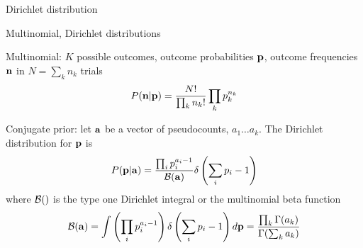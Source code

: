 \documentclass{beamer}
\begin{document}
\begin{frame}{Dirichlet distribution}

\itemb
\item Multinomial, Dirichlet distributions
 \itemb
 \item Multinomial: $K$ possible outcomes, outcome probabilities ${\bf p}$, outcome frequencies ${\bf n}$ in $N=\sum_k n_k$ trials
\[
P({\bf n}|{\bf p}) = \frac{N!}{\prod_k n_k!} \prod_k p_k^{n_k}
\]
\item Conjugate prior: let ${\bf a}$ be a vector of \alert{pseudocounts}, $a_1 \ldots a_k$. The \alert{Dirichlet distribution} for ${\bf p}$ is
\[
P({\bf p}|{\bf a}) = \frac{\prod_i p_i^{a_i-1}}{{\cal B}({\bf a})} \delta \left( \sum_i p_i - 1 \right)
\]
where ${\cal B}()$ is the \alert{type one Dirichlet integral} or the \alert{multinomial beta function}
\[
{\cal B}({\bf a})
= \int \left( \prod_i p_i^{a_i-1} \right) \delta \left( \sum_i p_i - 1 \right) d{\bf p}
= \frac{\prod_k \Gamma(a_k)}{\Gamma(\sum_k a_k)}
\]
\iteme
\iteme

\end{frame}
\end{document}
